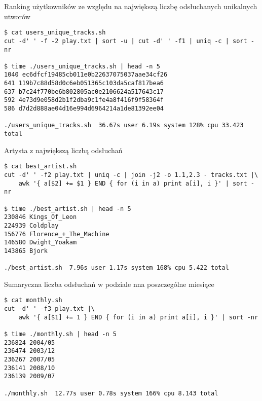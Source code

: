 \documentclass[a4paper,11pt]{article}
\begin{document}
\bigskip
\noindent
Ranking użytkowników ze względu na największą liczbę odsłuchanych unikalnych utworów
\begin{footnotesize}
\begin{verbatim}
$ cat users_unique_tracks.sh
cut -d' ' -f -2 play.txt | sort -u | cut -d' ' -f1 | uniq -c | sort -nr

$ time ./users_unique_tracks.sh | head -n 5
1040 ec6dfcf19485cb011e0b22637075037aae34cf26
641 119b7c88d58d0c6eb051365c103da5caf817bea6
637 b7c24f770be6b802805ac0e2106624a517643c17
592 4e73d9e058d2b1f2dba9c1fe4a8f416f9f58364f
586 d7d2d888ae04d16e994d6964214a1de81392ee04

./users_unique_tracks.sh  36.67s user 6.19s system 128% cpu 33.423 total
\end{verbatim}
\end{footnotesize}


\bigskip
\noindent
Artysta z największą liczbą odsłuchań
\begin{footnotesize}
\begin{verbatim}
$ cat best_artist.sh
cut -d' ' -f2 play.txt | uniq -c | join -j2 -o 1.1,2.3 - tracks.txt |\
    awk '{ a[$2] += $1 } END { for (i in a) print a[i], i }' | sort -nr

$ time ./best_artist.sh | head -n 5
230846 Kings_Of_Leon
224939 Coldplay
156776 Florence_+_The_Machine
146580 Dwight_Yoakam
143865 Bjork

./best_artist.sh  7.96s user 1.17s system 168% cpu 5.422 total
\end{verbatim}
\end{footnotesize}


\bigskip
\noindent
Sumaryczna liczba odsłuchań w podziale nna poszczególne miesiące
\begin{footnotesize}
\begin{verbatim}
$ cat monthly.sh
cut -d' ' -f3 play.txt |\
    awk '{ a[$1] += 1 } END { for (i in a) print a[i], i }' | sort -nr

$ time ./monthly.sh | head -n 5
236824 2004/05
236474 2003/12
236267 2007/05
236141 2008/10
236139 2009/07

./monthly.sh  12.77s user 0.78s system 166% cpu 8.143 total
\end{verbatim}
\end{footnotesize}
\end{document}
